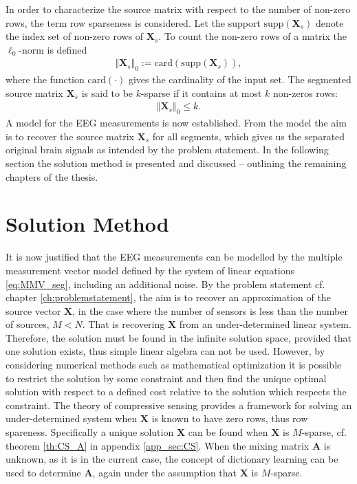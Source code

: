 In order to characterize the source matrix with respect to the number of non-zero rows, the term row sparseness is considered. 
Let the support $\text{supp}(\mathbf{X}_s)$ denote the index set of non-zero rows of $\mathbf{X}_s$.
To count the non-zero rows of a matrix the $\ell_0$-norm is defined 
\begin{align*}
\Vert \mathbf{X}_{s} \Vert_0 := \text{card}(\text{supp}(\mathbf{X}_{s})),
\end{align*}
where the function $\text{card}(\cdot)$ gives the cardinality of the input set. The segmented source matrix $\textbf{X}_s$ is said to be $k$-sparse if it contains at most $k$ non-zeros rows:
\begin{align*}
\Vert \mathbf{X}_s \Vert_0 \leq k.
\end{align*}
A model for the EEG measurements is now established.
From the model the aim is to recover the source matrix $\mathbf{X}_s$ for all segments, which gives us the separated original brain signals as intended by the problem statement. 
In the following section the solution method is presented and discussed -- outlining the remaining chapters of the thesis. 

\section{Solution Method}\label{sec:sol_met}
It is now justified that the EEG measurements can be modelled by the multiple measurement vector model defined by the system of linear equations \eqref{eq:MMV_seg}, including an additional noise.
By the problem statement cf. chapter \ref{ch:problemstatement}, the aim is to recover an approximation of the source vector $\mathbf{X}$, in the case where the number of sensors is less than the number of sources, $M < N$. 
That is recovering $\mathbf{X}$ from an under-determined linear system. 
Therefore, the solution must be found in the infinite solution space, provided that one solution exists, thus simple linear algebra can not be used. 
However, by considering numerical methods such as mathematical optimization it is possible to restrict the solution by some constraint and then find the unique optimal solution with respect to a defined cost relative to the solution which respects the constraint.
The theory of compressive sensing provides a framework for solving an under-determined system when $\mathbf{X}$ is known to have zero rows, thus row spareness. 
Specifically a unique solution $\mathbf{X}$ can be found when $\mathbf{X}$ is $M$-sparse, cf. theorem \ref{th:CS_A} in appendix \ref{app_sec:CS}. 
When the mixing matrix $\mathbf{A}$ is unknown, as it is in the current case, the concept of dictionary learning can be used to determine $\mathbf{A}$, again under the assumption that $\mathbf{X}$ is $M$-sparse.  

